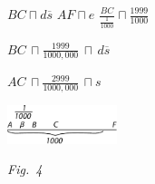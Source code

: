 \protect\rule[0pt]{0mm}{16pt}%
\pend%
%
%
%
\pstart%
\footnotesize%
\noindent%
$BC \sqcap d\overline{s}$ \quad $AF \sqcap e$
\pend%
%
\pstart%
\vspace*{2.0em}%
\noindent%
\footnotesize%
$\displaystyle \frac{BC}{\frac{1}{1000}} \sqcap \frac{1999}{1000}$
\protect\rule[0pt]{0mm}{16pt}%
%
\newline%
$\displaystyle{BC \,\sqcap \frac{1999}{1000,000}} \,\sqcap\, d\overline{s}$
\protect\rule[0pt]{0mm}{16pt}
%
\newline%
$\displaystyle{AC \,\sqcap \frac{2999}{1000,000}} \,\sqcap s$
\protect\rule[0pt]{0mm}{16pt}%
%
\pend%
%
  \vspace*{-7.5em}%
  \centerline{\hspace*{45mm}\includegraphics[width=0.24\textwidth]{gesamttex/edit_VIII,3/images/LH_35_09_15_001,022_d4.pdf}}%
  \vspace*{0.5em}
  \centerline{\hspace*{45mm}\lbrack\textit{Fig.~4}\rbrack}%
  \vspace*{-0.5em}%
  \vspace*{4.5em}%
%
\pstart%
\footnotesize%
\noindent%
